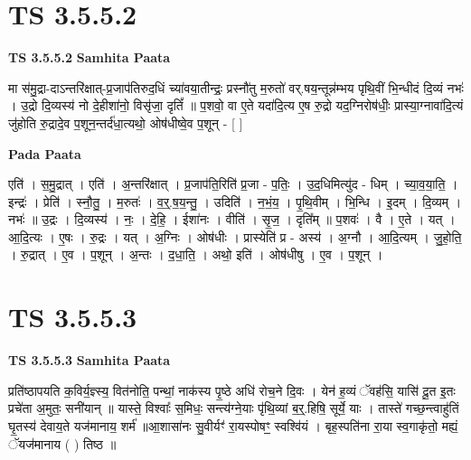 \documentclass[17pt]{extarticle}
\begin{document}
\section*{ TS 3.5.5.2 }

\textbf{TS 3.5.5.2 } \newline
\textbf{Samhita Paata} \newline

मा स॑मु॒द्रा-दाऽन्तरि॑क्षात्-प्र॒जाप॑तिरुद॒धिं च्या॑वया॒तीन्द्रः॒ प्रस्नौ॑तु म॒रुतो॑ वर्.षय॒न्तून्न॑म्भय पृथि॒वीं भि॒न्धीदं दि॒व्यं नभः॑ । उ॒द्रो दि॒व्यस्य॑ नो दे॒हीशा॑नो॒ विसृ॑जा॒ दृतिं᳚ ॥ प॒शवो॒ वा ए॒ते यदा॑दि॒त्य ए॒ष रु॒द्रो यद॒ग्निरोष॑धीः॒ प्रास्या॒ग्नावा॑दि॒त्यं जु॑होति रु॒द्रादे॒व प॒शून॒न्तर्द॑धा॒त्यथो॒ ओष॑धीष्वे॒व प॒शून् - [  ] \newline

\textbf{Pada Paata} \newline

एति॑ । स॒मु॒द्रात् । एति॑ । अ॒न्तरि॑क्षात् । प्र॒जाप॑ति॒रिति॑ प्र॒जा - प॒तिः॒ । उ॒द॒धिमित्यु॑द - धिम् । च्या॒व॒या॒ति॒ । इन्द्रः॑ । प्रेति॑ । स्नौ॒तु॒ । म॒रुतः॑ । व॒र्॒.ष॒य॒न्तु॒ । उदिति॑ । न॒भं॒य॒ । पृ॒थि॒वीम् । भि॒न्धि । इ॒दम् । दि॒व्यम् । नभः॑ ॥ उ॒द्रः । दि॒व्यस्य॑ । नः॒ । दे॒हि॒ । ईशा॑नः । वीति॑ । सृ॒ज॒ । दृति᳚म् ॥ प॒शवः॑ । वै । ए॒ते । यत् । आ॒दि॒त्यः । ए॒षः । रु॒द्रः । यत् । अ॒ग्निः । ओष॑धीः । प्रास्येति॑ प्र - अस्य॑ । अ॒ग्नौ । आ॒दि॒त्यम् । जु॒हो॒ति॒ । रु॒द्रात् । ए॒व । प॒शून् । अ॒न्तः । द॒धा॒ति॒ । अथो॒ इति॑ । ओष॑धीषु । ए॒व । प॒शून् ।  \newline




\section*{ TS 3.5.5.3 }

\textbf{TS 3.5.5.3 } \newline
\textbf{Samhita Paata} \newline

प्रति॑ष्ठापयति क॒विर्य॒ज्ञ्स्य॒ वित॑नोति॒ पन्थां॒ नाक॑स्य पृ॒ष्ठे अधि॑ रोच॒ने दि॒वः । येन॑ ह॒व्यं ॅवह॑सि॒ यासि॑ दू॒त इ॒तः प्रचे॑ता अ॒मुतः॒ सनी॑यान् ॥ यास्ते॒ विश्वाः᳚ स॒मिधः॒ सन्त्य॑ग्ने॒याः पृ॑थि॒व्यां ब॒र्॒.हिषि॒ सूर्ये॒ याः । तास्ते॑ गच्छ॒न्त्वाहु॑तिं घृ॒तस्य॑ देवाय॒ते यज॑मानाय॒ शर्म॑ ॥आ॒शासा॑नः सु॒वीर्यꣳ॑ रा॒यस्पोषꣳ॒॒ स्वश्वि॑यं । बृह॒स्पति॑ना रा॒या स्व॒गाकृ॑तो॒ मह्यं॒ ॅयज॑मानाय ( ) तिष्ठ ॥ \newline
\end{document}
